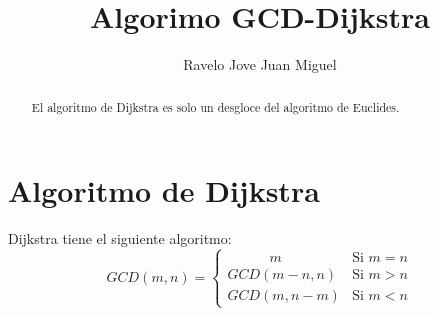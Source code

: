 \documentclass[a4paper,10pt]{article}
\title{Algorimo GCD-Dijkstra}
\author{Ravelo Jove Juan Miguel}
\begin{document}
\maketitle

\begin{abstract}
El algoritmo de Dijkstra es solo un desgloce del algoritmo de Euclides.
\end{abstract}

\section{Algoritmo de Dijkstra}
Dijkstra tiene el siguiente algoritmo:
\begin{equation*}
GCD(m,n)=
 \begin{cases}
    \quad \qquad m & \text{Si $m=n$}\\
    GCD(m-n,n) & \text{Si $m>n$}\\
    GCD(m,n-m) & \text{Si $m<n$}
 \end{cases}
\end{equation*}
\end{document}

